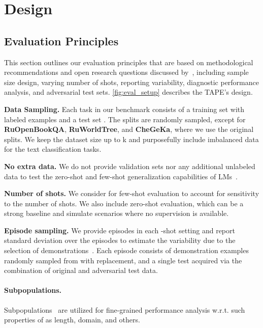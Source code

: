 \documentclass[11pt]{article}
\begin{document}
\section{Design}

\subsection{Evaluation Principles}
\label{sec:evaluation_principles}
This section outlines our evaluation principles that are based on methodological recommendations and open research questions discussed by~\citet{bragg2021flex,bowman-dahl-2021-will,beltagy-etal-2022-zero}, including sample size design, varying number of shots, reporting variability, diagnostic performance analysis, and adversarial test sets. \autoref{fig:eval_setup} describes the TAPE's design.


\vspace{0.1em}
\noindent\textbf{Data Sampling.} Each task in our benchmark consists of a training set  with labeled examples and a test set . The splits are randomly sampled, except for \textbf{RuOpenBookQA}, \textbf{RuWorldTree}, and \textbf{CheGeKa}, where we use the original splits. We keep the dataset size up to k and purposefully include imbalanced data for the text classification tasks.

\vspace{0.1em}
\noindent\textbf{No extra data.} We do not provide validation sets nor any additional unlabeled data to test the zero-shot and few-shot generalization capabilities of LMs~\cite{bao2019few,tam-etal-2021-improving}. 
 
\vspace{0.1em}
\noindent\textbf{Number of shots.} We consider  for few-shot evaluation to account for sensitivity to the number of shots. We also include zero-shot evaluation, which can be a strong baseline and simulate scenarios where no supervision is available.

\vspace{0.1em}
\noindent\textbf{Episode sampling.} We provide  episodes in each -shot setting  and report standard deviation over the episodes to estimate the variability due to the selection of demonstrations~\cite{schick-schutze-2021-just}. Each episode  consists of  demonstration examples  randomly sampled from  with replacement, and a single test  acquired via the combination of original and adversarial test data.

\paragraph{Subpopulations.} Subpopulations~\cite{goel-etal-2021-robustness} are utilized for fine-grained performance analysis w.r.t. such properties of  as length, domain, and others.
\end{document}
